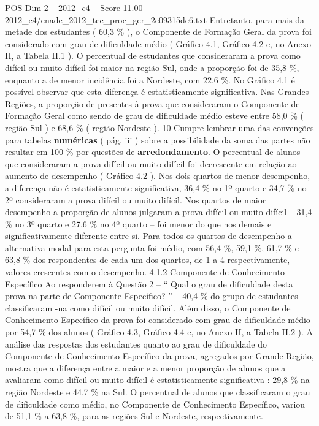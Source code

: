 \begin{textsample}{POS Dim 2 – 2012\_c4 – Score 11.00 – 2012\_c4/enade\_2012\_tec\_proc\_ger\_2c09315dc6.txt}
Entretanto, para mais da metade dos estudantes ( 60,3 \% ), o Componente de Formação Geral da prova foi considerado com grau de dificuldade médio ( Gráfico 4.1, Gráfico 4.2 e, no Anexo II, a Tabela II.1 ).
O percentual de estudantes que consideraram a prova como difícil ou muito difícil foi maior na região Sul, onde a proporção foi de 35,8 \%, enquanto a de menor incidência foi a Nordeste, com 22,6 \%.
No Gráfico 4.1 é possível observar que esta diferença é estatisticamente significativa.
Nas Grandes Regiões, a proporção de presentes à prova que consideraram o Componente de Formação Geral como sendo de grau de dificuldade médio esteve entre 58,0 \% ( região Sul ) e 68,6 \% ( região Nordeste ). 10 Cumpre lembrar uma das convenções para tabelas \textbf{numéricas} ( pág. iii ) sobre a possibilidade da soma das partes não resultar em 100 \% por questões de \textbf{arredondamento}.
O percentual de alunos que consideraram a prova difícil ou muito difícil foi decrescente em relação ao aumento de desempenho ( Gráfico 4.2 ).
Nos dois quartos de menor desempenho, a diferença não é estatisticamente significativa, 36,4 \% no 1º quarto e 34,7 \% no 2º consideraram a prova difícil ou muito difícil.
Nos quartos de maior desempenho a proporção de alunos julgaram a prova difícil ou muito difícil – 31,4 \% no 3º quarto e 27,6 \% no 4º quarto – foi menor do que nos demais e significativamente diferente entre si.
Para todos os quartos de desempenho a alternativa modal para esta pergunta foi médio, com 56,4 \%, 59,1 \%, 61,7 \% e 63,8 \% dos respondentes de cada um dos quartos, de 1 a 4 respectivamente, valores crescentes com o desempenho. 4.1.2 Componente de Conhecimento Específico Ao responderem à Questão 2 – “ Qual o grau de dificuldade desta prova na parte de Componente Específico? ” – 40,4 \% do grupo de estudantes classificaram -na como difícil ou muito difícil.
Além disso, o Componente de Conhecimento Específico da prova foi considerado com grau de dificuldade médio por 54,7 \% dos alunos ( Gráfico 4.3, Gráfico 4.4 e, no Anexo II, a Tabela II.2 ).
A análise das respostas dos estudantes quanto ao grau de dificuldade do Componente de Conhecimento Específico da prova, agregados por Grande Região, mostra que a diferença entre a maior e a menor proporção de alunos que a avaliaram como difícil ou muito difícil é estatisticamente significativa : 29,8 \% na região Nordeste e 44,7 \% na Sul.
O percentual de alunos que classificaram o grau de dificuldade como médio, no Componente de Conhecimento Específico, variou de 51,1 \% a 63,8 \%, para as regiões Sul e Nordeste, respectivamente.

\end{textsample}
